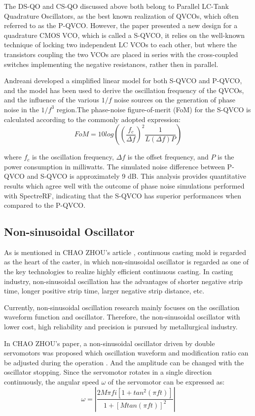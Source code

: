 \documentclass[conference]{IEEEtran}
\begin{document}
The DS-QO and CS-QO discussed above both belong to Parallel LC-Tank Quadrature Oscillators, as the best known realization of QVCOs, which often referred to as the P-QVCO. However, the paper \cite{b10} presented a new design for a quadrature CMOS VCO, which is called a S-QVCO, it relies on the well-known technique of locking two independent LC VCOs to each other, but where the transistors coupling the two VCOs are placed in series with the cross-coupled switches implementing the negative resistances, rather then in parallel. 

Andreani developed a simplified linear model for both S-QVCO and P-QVCO, and the model has been used to derive the oscillation frequency of the QVCOs, and the influence of the various $1/f$ noise sources on the generation of phase noise in the $1/f^3$ region.The phase-noise figure-of-merit (FoM) for the S-QVCO is calculated according to the commonly
adopted expression:
\begin{equation}
FoM=10log((\frac{f_c}{\Delta f})^2\frac{1}{L(\Delta f)P})
\label{eq4-2}
\end{equation}

where $f_c$ is the oscillation frequency, $\Delta f$ is the offset frequency, and $P$ is the power consumption in milliwatts. The simulated noise difference between P-QVCO and S-QVCO is approximately 9 dB. This analysis provides quantitative results which agree well with the outcome of phase noise simulations performed with SpectreRF, indicating that the S-QVCO has superior performances when compared to the P-QVCO.

\subsection{Non-sinusoidal Oscillator}
As is mentioned in CHAO ZHOU's article \cite{b11}, continuous casting mold is regarded as the heart of the caster, in which non-sinusoidal oscillator is regarded as one of the key technologies to realize highly efficient continuous casting. In casting industry, non-sinusoidal oscillation has the advantages of shorter negative strip time, longer positive strip time, larger negative strip distance, etc. 

Currently, non-sinusoidal oscillation research mainly focuses on the oscillation waveform function and oscillator. Therefore, the non-sinusoidal oscillator with lower cost, high reliability and precision is pursued by metallurgical industry. 

In CHAO ZHOU's paper, a non-sinusoidal oscillator driven by double servomotors was proposed which oscillation waveform and modification ratio can be adjusted during the operation \cite{b11}. And the amplitude can be changed with the oscillator stopping. Since the servomotor rotates in a single direction continuously,  the angular speed $\omega$ of the servomotor can be expressed as:
\begin{equation}
\omega=|\frac{2M\pi fi[1+tan^2(\pi ft)]}{1+[Mtan(\pi ft)]^2}|
\label{eq4-3}
\end{equation}
\end{document}
